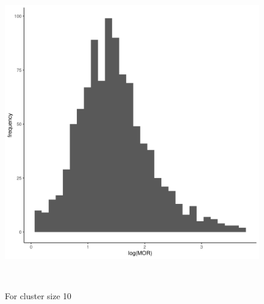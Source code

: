 \documentclass[
  letterpaper,
  DIV=11,
  numbers=noendperiod,
  titlepage]{scrartcl}
\begin{document}
\begin{figure}
\begin{minipage}[t]{0.50\linewidth}
{{\includegraphics{../../plots/two-lvl-ran-int/high-prev/hist_10_10_two_lvl_high_prev.png}

}

\caption{For cluster size 10}

}

\end{minipage}%
\newline
\begin{minipage}[t]{\linewidth}

{\centering 

~

}

\end{minipage}%
\newline
\begin{minipage}[t]{0.50\linewidth}

{\centering 

\raisebox{-\height}{

}}
\end{minipage}
\end{figure}
\end{document}
